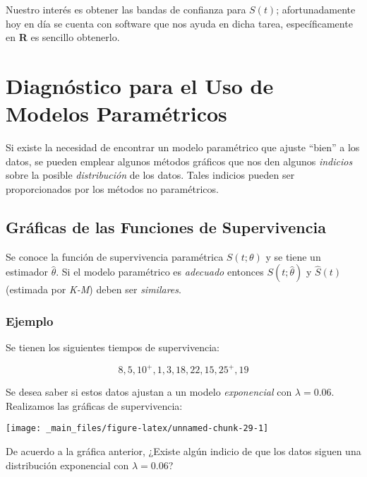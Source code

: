 \documentclass[
  a4paper,
  oneside,
  openany]{book}
\begin{document}
Nuestro interés es obtener las bandas de confianza para \(S(t)\); afortunadamente hoy en día se cuenta con software que nos ayuda en dicha tarea, específicamente en \textbf{R} es sencillo obtenerlo.

\hypertarget{diagnuxf3stico-para-el-uso-de-modelos-paramuxe9tricos}{%
\section{Diagnóstico para el Uso de Modelos Paramétricos}\label{diagnuxf3stico-para-el-uso-de-modelos-paramuxe9tricos}}

Si existe la necesidad de encontrar un modelo paramétrico que ajuste ``bien'' a los datos, se pueden emplear algunos métodos gráficos que nos den algunos \emph{indicios} sobre la posible \emph{distribución} de los datos. Tales indicios pueden ser proporcionados por los métodos no paramétricos.

\hypertarget{gruxe1ficas-de-las-funciones-de-supervivencia}{%
\subsection{Gráficas de las Funciones de Supervivencia}\label{gruxe1ficas-de-las-funciones-de-supervivencia}}

Se conoce la función de supervivencia paramétrica \(S(t ;\theta)\) y se tiene un estimador \(\hat \theta\). Si el modelo paramétrico es \emph{adecuado} entonces \(S(t ;\hat {\theta})\) y \(\hat S(t)\)(estimada por \emph{K-M}) deben ser \emph{similares}.

\hypertarget{ejemplo-12}{%
\subsubsection*{Ejemplo}\label{ejemplo-12}}


Se tienen los siguientes tiempos de supervivencia:

\[
8,5,10^+,1,3,18,22,15,25^+,19
\]

Se desea saber si estos datos ajustan a un modelo \emph{exponencial} con \(\lambda =0.06\). Realizamos las gráficas de supervivencia:

\begin{center}\texttt{[image: \_main\_files/figure-latex/unnamed-chunk-29-1]} \end{center}

De acuerdo a la gráfica anterior, ¿Existe algún indicio de que los datos siguen una distribución exponencial con \(\lambda =0.06\)?
\end{document}
